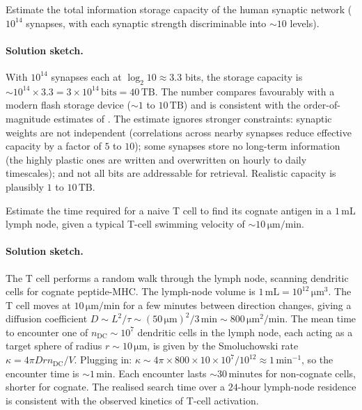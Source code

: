 \begin{exercise}
Estimate the total information storage capacity of the human
synaptic network ($10^{14}$ synapses, with each synaptic strength
discriminable into $\sim 10$ levels).
\end{exercise}

\paragraph{Solution sketch.}
With $10^{14}$ synapses each at $\log_2 10 \approx 3.3$ bits, the
storage capacity is
$\sim 10^{14} \times 3.3 = 3 \times 10^{14}\,\text{bits} = 40\,\text{TB}$.
The number compares favourably with a modern flash storage device
($\sim 1$ to $10\,\text{TB}$) and is consistent with the order-of-
magnitude estimates of \cite[ch.~67]{text:v6c07-kandel-principles-2021}.
The estimate ignores stronger constraints: synaptic weights are
not independent (correlations across nearby synapses reduce effective
capacity by a factor of $5$ to $10$); some synapses store no
long-term information (the highly plastic ones are written and
overwritten on hourly to daily timescales); and not all bits are
addressable for retrieval. Realistic capacity is plausibly
$1$ to $10\,\text{TB}$.

\begin{exercise}
Estimate the time required for a naive T cell to find its cognate
antigen in a $1\,\text{mL}$ lymph node, given a typical T-cell
swimming velocity of $\sim 10\,\si{\micro\meter}/\text{min}$.
\end{exercise}

\paragraph{Solution sketch.}
The T cell performs a random walk through the lymph node, scanning
dendritic cells for cognate peptide-MHC. The lymph-node volume is
$1\,\text{mL} = 10^{12}\,\si{\micro\meter}^3$. The T cell moves at
$10\,\si{\micro\meter}/\text{min}$ for a few minutes between
direction changes, giving a diffusion coefficient
$D \sim L^2/\tau \sim (50\,\si{\micro\meter})^2/3\,\text{min}
\sim 800\,\si{\micro\meter}^2/\text{min}$. The mean time to
encounter one of $n_{\text{DC}} \sim 10^7$ dendritic cells in the
lymph node, each acting as a target sphere of radius
$r \sim 10\,\si{\micro\meter}$, is given by the Smoluchowski rate
$\kappa = 4 \pi D r n_{\text{DC}} / V$. Plugging in:
$\kappa \sim 4 \pi \times 800 \times 10 \times 10^7 / 10^{12}
\approx 1\,\text{min}^{-1}$, so the encounter time is $\sim 1\,\text{min}$.
Each encounter lasts $\sim 30\,\text{minutes}$ for non-cognate cells,
shorter for cognate. The realised search time over a $24$-hour
lymph-node residence is consistent with the observed kinetics of
T-cell activation.

